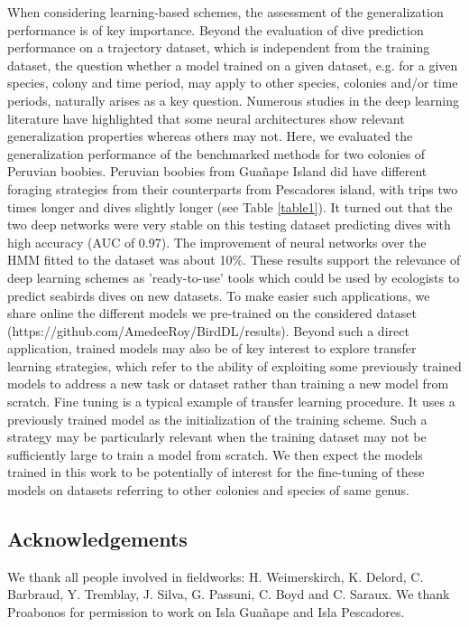 \documentclass{article}
\begin{document}
When considering learning-based schemes, the assessment of the generalization performance is of key importance. Beyond the evaluation of dive prediction performance on a trajectory dataset, which is independent from the training dataset, the question whether a model trained on a given dataset, e.g. for a given species, colony and time period, may apply to other species, colonies and/or time periods, naturally arises as a key question. Numerous studies in the deep learning literature \cite{kawaguchi_generalization_2020,zhang_understanding_2017} have highlighted that some neural architectures show relevant generalization properties whereas others may not.
Here, we evaluated the generalization performance of the benchmarked methods for two colonies of Peruvian boobies.
Peruvian boobies from  Gua\~nape Island did have different foraging strategies from their counterparts from Pescadores island, with trips two times longer and dives slightly longer (see Table \ref{table1}). It turned out that the two deep networks were very stable on this testing dataset predicting dives with high accuracy (AUC of 0.97). The improvement of neural networks over the HMM fitted to the dataset was about 10\%.
These results support the relevance of deep learning schemes as
'ready-to-use' tools which could be used by ecologists to predict
seabirds dives on new datasets. To make easier such applications, we share online the different models we pre-trained on the considered dataset (https://github.com/AmedeeRoy/BirdDL/results).
Beyond such a direct application, trained models may also be of key interest to explore transfer learning strategies, which refer to the ability of exploiting some previously trained models to address a new task or dataset rather than training a new model from scratch. Fine tuning is a typical example of transfer learning procedure. It uses a previously trained model as the initialization of the training scheme. Such a strategy may be particularly relevant when the training dataset may not be sufficiently large to train a model from scratch. We then expect the models trained in this work to be potentially of interest for the fine-tuning of these models on datasets referring to other colonies and species of same genus.

\subsection*{Acknowledgements}
We thank all people involved in fieldworks: H. Weimerskirch, K. Delord, C. Barbraud, Y. Tremblay, J. Silva, G. Passuni, C. Boyd and C. Saraux. We thank Proabonos for permission to work on Isla Gua\~nape  and Isla Pescadores.
\end{document}
